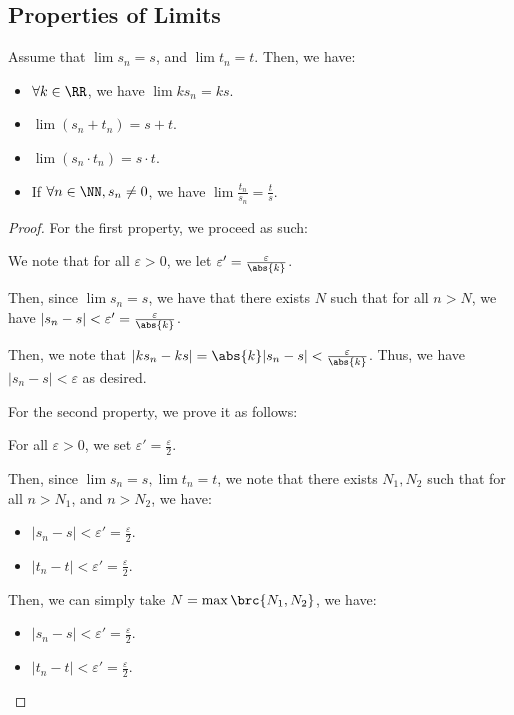\documentclass[openany]{book}
\begin{document}
\subsection{Properties of Limits}
\begin{thm}
	Assume that $\lim s_n = s$, and $\lim t_n = t$. Then, we have:
	\begin{itemize}
		\item $\forall k \in \RR$, we have $\lim ks_n = ks$.
		\item $\lim(s_n + t_n) = s + t$.
		\item $\lim (s_n \cdot t_n) = s \cdot t$.
		\item If $\forall n \in \NN, s_n \neq 0$, we have $\lim \frac{t_n}{s_n} = \frac{t}{s}$.
	\end{itemize}
\end{thm}
\begin{proof}
	For the first property, we proceed as such:
	\begin{innerproof}
		We note that for all $\varepsilon > 0$, we let $\varepsilon' = \frac{\varepsilon}{\abs{k}}$.
		
		Then, since $\lim s_n = s$, we have that there exists $N$ such that for all $n > N$, we have $\lvert s_n - s \rvert < \varepsilon' = \frac{\varepsilon}{\abs{k}}$.
		
		Then, we note that $\lvert ks_n - ks \rvert = \abs{k}\lvert s_n - s \rvert < \frac{\varepsilon}{\abs{k}}$. Thus, we have $\lvert s_n - s \rvert < \varepsilon$ as desired.
	\end{innerproof}
	
	For the second property, we prove it as follows:
	\begin{innerproof}
		For all $\varepsilon > 0$, we set $\varepsilon' = \frac{\varepsilon}{2}$.
		
		Then, since $\lim s_n = s, \lim t_n = t$, we note that there exists $N_1, N_2$ such that for all $n > N_1$, and $n > N_2$, we have:
		\begin{itemize}
			\item $\lvert s_n - s \rvert < \varepsilon' = \frac{\varepsilon}{2}$.
			\item $\lvert t_n - t \rvert < \varepsilon' = \frac{\varepsilon}{2}$.
		\end{itemize}
		
		Then, we can simply take $N = \max\brc{N_1, N_2}$, we have:
		\begin{itemize}
			\item $\lvert s_n - s \rvert < \varepsilon' = \frac{\varepsilon}{2}$.
			\item $\lvert t_n - t \rvert < \varepsilon' = \frac{\varepsilon}{2}$.
		\end{itemize}
		

\end{innerproof}
\end{proof}
\end{document}
